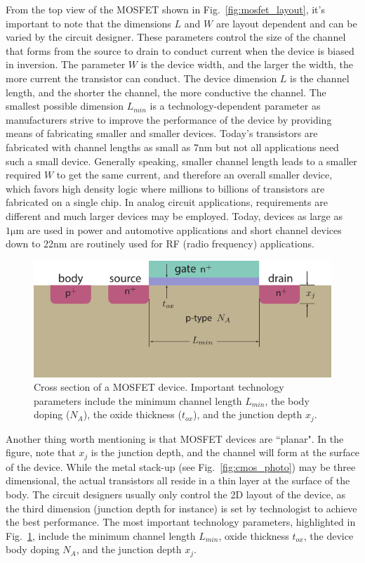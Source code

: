 From the top view of the MOSFET shown in Fig.~\ref{fig:mosfet_layout}, it's important to note that the dimensions $L$ and $W$ are layout dependent and can be varied by the circuit designer.  These parameters control the size of the channel that forms from the source to drain to conduct current when the device is biased in inversion.  The parameter $W$ is the device width, and the larger the width, the more current the transistor can conduct.  The device dimension $L$ is the channel length, and  the shorter the channel, the more conductive the channel.  The smallest possible dimension $L_{min}$ is a technology-dependent parameter as manufacturers strive to improve the performance of the device by providing means of fabricating smaller and smaller devices.  Today's transistors are fabricated with channel lengths as small as 7nm but not all applications need such a small device.  Generally speaking, smaller channel length leads to a smaller required $W$ to get the same current, and therefore an overall smaller device, which favors high density logic where millions to billions of transistors are fabricated on a single chip.  In analog circuit applications, requirements are different and much larger devices may be employed.  Today, devices as large as $1\mathrm{\mu m}$ are used in power and automotive applications and short channel devices down to 22nm are routinely used for RF (radio frequency) applications.  
\begin{figure}[tb]
\centering
\includegraphics[width=.75\columnwidth]{mos_tech}
\caption{Cross section of a MOSFET device. Important technology parameters include the minimum channel length $L_{min}$, the body doping ($N_A$), the oxide thickness ($t_{ox}$), and the junction depth $x_j$.}
\label{fig:mos_tech}
\end{figure}
Another thing worth mentioning is that MOSFET devices are ``planar".  In the figure, note that $x_j$ is the junction depth, and the channel will form at the surface of the device.  While the metal stack-up (see Fig.~\ref{fig:cmos_photo}) may be three dimensional, the actual transistors all reside in a thin layer at the surface of the body.  The circuit designers usually only control the 2D layout of the device, as the third dimension (junction depth for instance) is set by technologist to achieve the best performance.  The most important technology parameters, highlighted in Fig.~\ref{fig:mos_tech}, include the minimum channel length $L_{min}$, oxide thickness $t_{ox}$, the device body doping $N_A$, and the junction depth $x_j$.
